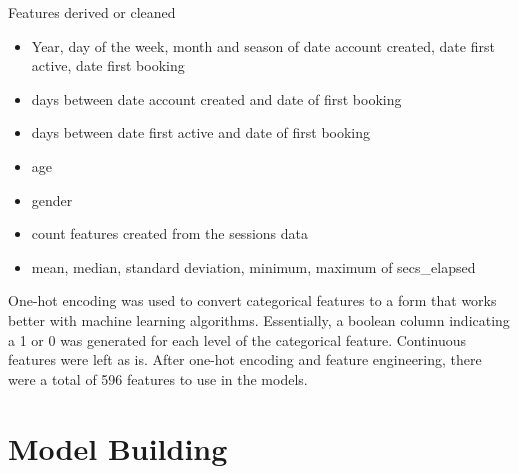 \documentclass{article}
\begin{document}
Features derived or cleaned 
\begin{itemize}
  \item Year, day of the week, month and season of date account created, date first active, date first booking 
  \item days between date account created and date of first booking
  \item days between date first active and date of first booking 
  \item age
  \item gender
  \item count features created from the sessions data 
  \item mean, median, standard deviation, minimum, maximum of secs\_elapsed
\end{itemize}

One-hot encoding was used to convert categorical features to a form that works better with machine learning 
algorithms. Essentially, a boolean column indicating a 1 or 0 was generated for each level of the categorical feature.
Continuous features were left as is. After one-hot encoding and feature engineering, there were a total of 596
features to use in the models. 

\section{Model Building}
\end{document}

